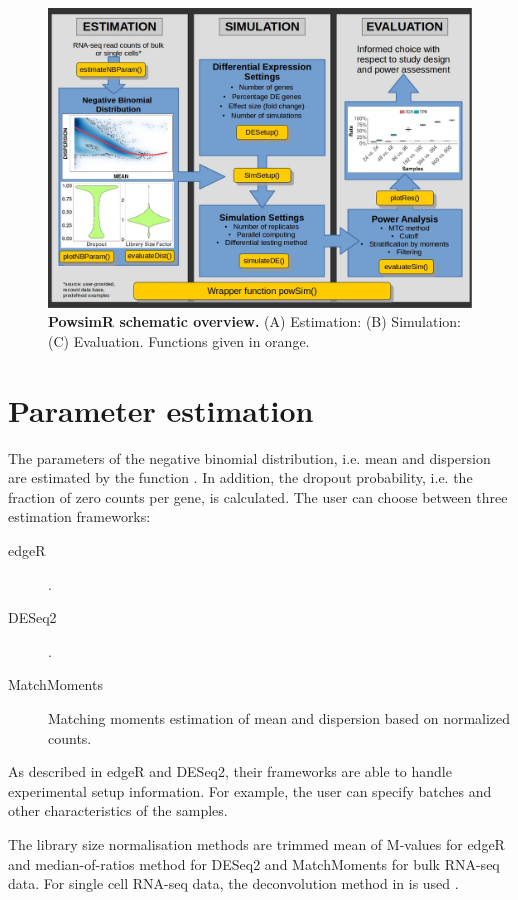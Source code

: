 \documentclass{article}\usepackage[]{graphicx}\usepackage[usenames,dvipsnames]{color}
\begin{document}
\begin{figure}[h]
\centering
\includegraphics[width=0.9\linewidth]{powsim_schematic.jpeg}
\caption{\textbf{PowsimR schematic overview.} (A) Estimation: (B) Simulation: (C) Evaluation. Functions given in orange.}
\label{fig:powsim_scheme}
\end{figure}

\section{Parameter estimation}

The parameters of the negative binomial distribution, i.e. mean and dispersion are estimated by the function . In addition, the dropout probability, i.e. the fraction of zero counts per gene, is calculated.
The user can choose between three estimation frameworks:
\begin{description}
\item[edgeR]  \cite{Robinson2010-ni}.
\item[DESeq2]  \cite{Love2014-je}.
\item[MatchMoments] Matching moments estimation of mean and dispersion based on normalized counts.
\end{description}

As described in edgeR and DESeq2, their frameworks are able to handle experimental setup information. For example, the user can specify batches and other characteristics of the samples.

The library size normalisation methods are trimmed mean of M-values for edgeR and median-of-ratios method for DESeq2 and MatchMoments for bulk RNA-seq data. For single cell RNA-seq data, the deconvolution method  in  is used \cite{Lun2016-ep}.
\end{document}
